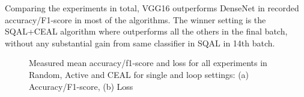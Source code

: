 Comparing the experiments in total, VGG16 outperforms DenseNet in recorded accuracy/F1-score in most of the algorithms. The winner setting is the SQAL+CEAL algorithm where outperforms all the others in the final batch, without any substantial gain from same classifier in SQAL in 14th batch.


\begin{figure}[h!]
    \centering  
    \caption{Measured mean accuracy/f1-score and loss for all experiments in Random, Active and CEAL for single and loop settings: (a) Accuracy/F1-score, (b) Loss}
    \label{c5:figure_simulation_acc_loss_all}
\end{figure}

